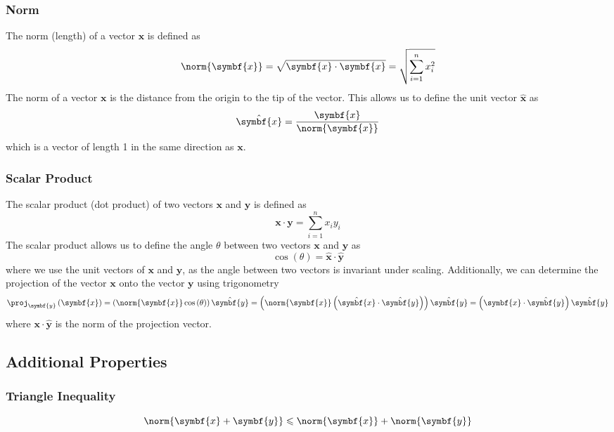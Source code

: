 \documentclass{article}
\begin{document}
\subsubsection{Norm}
The norm (length) of a vector \(\symbf{x}\) is defined as
\begin{equation*}
    \norm{\symbf{x}} = \sqrt{\symbf{x} \cdot \symbf{x}} = \sqrt{\sum_{i=1}^n x_i^2}
\end{equation*}
The norm of a vector \(\symbf{x}\) is the distance from the origin to the tip of the vector.
This allows us to define the unit vector \(\hat{\symbf{x}}\) as
\begin{equation*}
    \hat{\symbf{x}} = \frac{\symbf{x}}{\norm{\symbf{x}}}
\end{equation*}
which is a vector of length 1 in the same direction as \(\symbf{x}\).
\subsubsection{Scalar Product}
The scalar product (dot product) of two vectors \(\symbf{x}\) and \(\symbf{y}\) is defined as
\begin{equation*}
    \symbf{x} \cdot \symbf{y} = \sum_{i=1}^n x_i y_i
\end{equation*}
The scalar product allows us to define the angle \(\theta\) between two vectors \(\symbf{x}\) and \(\symbf{y}\) as
\begin{equation*}
    \cos{\left( \theta \right)} = \hat{\symbf{x}} \cdot \hat{\symbf{y}}
\end{equation*}
where we use the unit vectors of \(\symbf{x}\) and \(\symbf{y}\), as the angle between two vectors is invariant under scaling.
Additionally, we can determine the projection of the vector \(\symbf{x}\) onto the vector \(\symbf{y}\) using trigonometry
\begin{equation*}
    \proj_{\symbf{y}} \left( \symbf{x} \right) = \left( \norm{\symbf{x}} \cos{\left( \theta \right)} \right) \hat{\symbf{y}} = \left( \norm{\symbf{x}} \left( \hat{\symbf{x}} \cdot \hat{\symbf{y}} \right) \right) \hat{\symbf{y}} = \left( \symbf{x} \cdot \hat{\symbf{y}} \right) \hat{\symbf{y}}
\end{equation*}
where \(\symbf{x} \cdot \hat{\symbf{y}}\) is the norm of the projection vector.
\subsection{Additional Properties}
\subsubsection{Triangle Inequality}
\begin{equation*}
    \norm{\symbf{x} + \symbf{y}} \leqslant \norm{\symbf{x}} + \norm{\symbf{y}}
\end{equation*}
\end{document}
